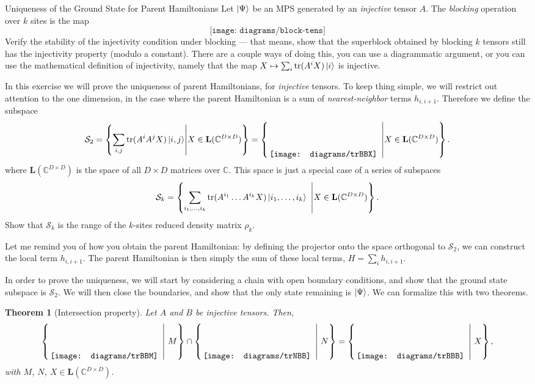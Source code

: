 \documentclass[a4paper,10pt,twoside]{article}
\DeclareMathOperator{\trace}{tr}
\theoremstyle{modern}
\newtheorem{theorem}[lemma]{Theorem}
\begin{document}
\begin{section}{Uniqueness of the Ground State for Parent Hamiltonians}
Let $\ket{\Psi}$ be an MPS generated by an \emph{injective} tensor $A$.
The \emph{blocking} operation over $k$ sites is the map
\[
  \texttt{[image: diagrams/block-tens]}
\]
Verify the stability of the injectivity condition under blocking --- that means, show that the superblock obtained by blocking $k$ tensors still has the injectivity property (modulo a constant).
There are a couple ways of doing this, you can use a diagrammatic argument,
or you can use the mathematical definition of injectivity, namely that the map $X \mapsto \sum_i \trace(A^i X) \ket{i}$ is injective.

In this exercise we will prove the uniqueness of parent Hamiltonians, for \emph{injective} tensors. 
To keep thing simple, we will restrict out attention to the one dimension, in the case where the parent Hamiltonian is a sum of \emph{nearest-neighbor} terms $h_{i,i+1}$.
Therefore we define the subspace
\[
  \mathcal S_2=\left\{ \sum_{i,j}\trace(A^iA^jX)\ket{i,j} \middle\vert X\in\mathbf{L}(\mathbb{C}^{D \times D}) \right\} =
    \left\{\raisebox{-1.7em}{\,\texttt{[image: diagrams/trBBX]}}\ \,\middle\vert X\in \mathbf{L}(\mathbb{C}^{D \times D}) \right\}.
\]
where $\mathbf{L}(\mathbb{C}^{D \times D})$ is the space of all $D \times D$ matrices over $\mathbb{C}$.
This space is just a special case of a series of subspaces
\[
  \mathcal{S}_k = \left\{\sum_{i_1,\dots,i_k}  \trace(A^{i_1} \dots A^{i_k} X) \ket{i_1,\dots,i_k}\ \,\middle\vert X \in \mathbf{L}(\mathbb{C}^{D \times D})\right\}.
\]
Show that $\mathcal{S}_k$ is the range of the $k$-sites reduced density matrix $\rho_k$.

Let me remind you of how you obtain the parent Hamiltonian: by defining the projector onto the space orthogonal to $\mathcal{S}_2$, we can construct the local term $h_{i,i+1}$.
The parent Hamiltonian is then simply the sum of these local terms, $H = \sum_i h_{i,i+1}$.

In order to prove the uniqueness, we will start by considering a chain with open boundary conditions, and show that the ground state subspace is $\mathcal{S}_2$.
We will then close the boundaries, and show that the only state remaining is $\ket{\Psi}$.
We can formalize this with two theorems.

\begin{theorem}[Intersection property]
\label{thm:intersection}
Let $A$ and $B$ be injective tensors.
Then,
\[
    \left\{\raisebox{-1.7em}{\,\texttt{[image: diagrams/trBBM]}}\ \,\middle\vert \ M \right\}
    \cap
    \left\{\raisebox{-1.7em}{\,\texttt{[image: diagrams/trNBB]}}\ \,\middle\vert \ N \right\}=
    \left\{\raisebox{-1.7em}{\,\texttt{[image: diagrams/trBBB]}}\ \,\middle\vert \ X \right\},
\]
with $M$, $N$, $X \in \mathbf{L}(\mathbb{C}^{D \times D})$.
\end{theorem}


\end{section}
\end{document}
